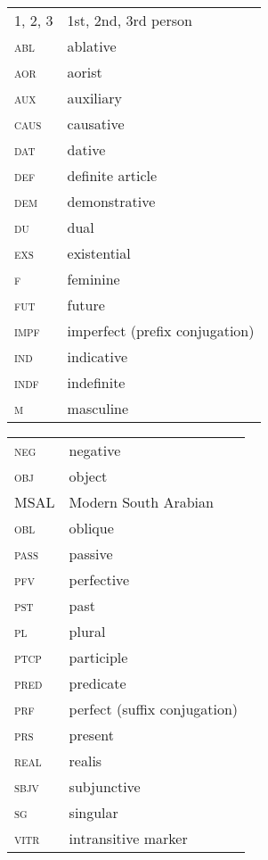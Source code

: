 \documentclass[output=paper]{langsci/langscibook}
\begin{document}
\begin{tabularx}{.5\textwidth}{@{}lQ@{}}
\textsc{1, 2, 3} & 1st, 2nd, 3rd person \\
\textsc{abl} & ablative \\
\textsc{aor} & aorist \\
\textsc{aux} & auxiliary \\
\textsc{caus} & causative \\
\textsc{dat} & dative \\
\textsc{def} & definite article \\
\textsc{dem} & demonstrative \\
\textsc{du} & dual \\
\textsc{exs} & existential \\
\textsc{f} & feminine \\
\textsc{fut} & future \\
\textsc{impf} & imperfect (prefix conjugation) \\
\textsc{ind} & indicative \\
\textsc{indf} & indefinite \\
\textsc{m} & masculine \\
\end{tabularx}%
\begin{tabularx}{.5\textwidth}{@{}lQ@{}}
\textsc{neg} & negative \\
\textsc{obj} & object \\
MSAL & Modern South Arabian \\
\textsc{obl} & oblique \\
\textsc{pass} & passive \\
\textsc{pfv} & perfective \\
\textsc{pst} & past \\
\textsc{pl} & plural \\
\textsc{ptcp} & participle \\
\textsc{pred} & predicate \\
\textsc{prf} & perfect (suffix conjugation) \\
\textsc{prs} & present \\
\textsc{real} & realis \\
\textsc{sbjv} & subjunctive \\
\textsc{sg} & singular \\
\textsc{vitr} & intransitive marker \\
\end{tabularx}%



\sloppy
\printbibliography[heading=subbibliography,notkeyword=this]
\end{document}
